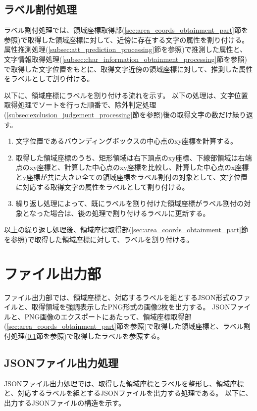 \subsection{ラベル割付処理}\label{subsec:label_link_processing}
ラベル割付処理では、領域座標取得部(\ref{sec:area_coords_obtainment_part}節を参照)で取得した領域座標に対して、近傍に存在する文字の属性を割り付ける。
属性推測処理(\ref{subsec:att_prediction_processing}節を参照)で推測した属性と、文字情報取得処理(\ref{subsec:char_information_obtainment_processing}節を参照)で取得した文字位置をもとに、取得文字近傍の領域座標に対して、推測した属性をラベルとして割り付ける。

以下に、領域座標にラベルを割り付ける流れを示す。
以下の処理は、文字位置取得処理でソートを行った順番で、除外判定処理(\ref{subsec:exclusion_judgement_processing}節を参照)後の取得文字の数だけ繰り返す。

\begin{enumerate}
    \item 文字位置であるバウンディングボックスの中心点のxy座標を計算する。
    \item 取得した領域座標のうち、矩形領域は右下頂点のxy座標、下線部領域は右端点のxy座標と、計算した中心点のxy座標を比較し、計算した中心点のx座標とy座標が共に大きい全ての領域座標をラベル割付の対象として、文字位置に対応する取得文字の属性をラベルとして割り付ける。
    \item 繰り返し処理によって、既にラベルを割り付けた領域座標がラベル割付の対象となった場合は、後の処理で割り付けるラベルに更新する。
\end{enumerate}

以上の繰り返し処理後、領域座標取得部(\ref{sec:area_coords_obtainment_part}節を参照)で取得した領域座標に対して、ラベルを割り付ける。

\section{ファイル出力部}\label{subsec:file_output_part}
ファイル出力部では、領域座標と、対応するラベルを組とするJSON形式のファイルと、取得領域を強調表示したPNG形式の画像2枚を出力する。
JSONファイルと、PNG画像のエクスポートにあたって、領域座標取得部(\ref{sec:area_coords_obtainment_part}節を参照)で取得した領域座標と、ラベル割付処理(\ref{subsec:label_link_processing}節を参照)で取得したラベルを参照する。


\subsection{JSONファイル出力処理}\label{subsec:json_file_output_processing}
JSONファイル出力処理では、取得した領域座標とラベルを整形し、領域座標と、対応するラベルを組とするJSONファイルを出力する処理である。
以下に、出力するJSONファイルの構造を示す。

